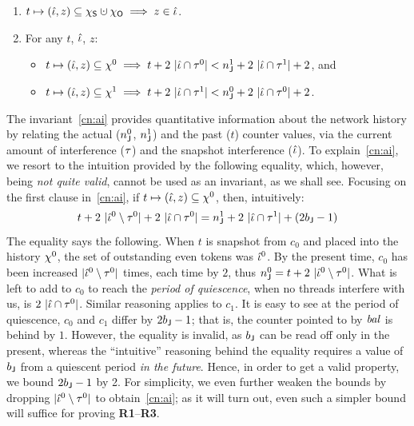 \begin{enumerate}[label=(\roman*)]

\item\label{cn:ti1}
%
  $t \mapsto (\tknh, z) \subseteq \hists \hunion \histo
  \implies z \in \tknh$. \\[-7pt]

\item\label{cn:ai} 
%
For any $t$, $\hat{\iota}$, $z$: \\[-7pt]
% 
{\small
  \begin{itemize}
  \item   $t \mapsto (\hat{\iota}, z) \subseteq \chi^0 \implies t + 2\ |\hat{\iota}
    \cap \tau^0| < n^1_{\mathsf{J}} + 2\ |\hat{\iota} \cap \tau^1| + 2$, and \\[-7pt]
  \item
    $t \mapsto (\hat{\iota}, z) \subseteq \chi^1 \implies t + 2\ |\hat{\iota} \cap 
    \tau^1| < n^0_{\mathsf{J}} + 2\ |\hat{\iota} \cap \tau^0|
    + 2$.
  \end{itemize}
}
%
\end{enumerate}
\vspace{5pt}
 
\noindent
The invariant~\ref{cn:ai} provides quantitative information about the
network history by relating the actual ($n^0_{\mathsf{J}}$, $n^1_{\mathsf{J}}$)
and the past ($t$) counter values, via the current amount of
interference ($\tau$) and the snapshot interference ($\hat{\iota}$).
%
To explain~\ref{cn:ai}, we resort to the intuition provided by the
following equality, which, however, being \emph{not quite valid},
cannot be used as an invariant, as we shall see. Focusing on the
first clause in~\ref{cn:ai}, if
$t \mapsto (\hat{\iota}, z) \subseteq \chi^0$, then,
intuitively:
%
{\small{
\[
t + 2\ |\tknh^0 \setminus \tkn^0 | + 2\ |\tknh \cap \tkn^0| =
n^1_\joint + 2\ |\tknh \cap \tkn^1| + (2 b_\joint - 1)
\]}}
%
\noindent
The equality says the following. When $t$ is snapshot from $c_0$ and
placed into the history $\chi^0$, the set of outstanding even tokens
was $\hat{\iota}^0$. By the present time, $c_0$ has been increased
$|\hat{\iota}^0 \setminus \tau^0|$ times, each time by $2$, thus
$n^0_{\mathsf{J}} = t + 2\ |\hat{\iota}^0 \setminus \tau^0|$. What is left to add
to $c_0$ to reach the \emph{period of quiescence}, when no threads
interfere with us, is $2\ |\hat{\iota} \cap \tau^0|$. Similar reasoning
applies to $c_1$. It is easy to see at the period of quiescence, $c_0$
and $c_1$ differ by $2 b_{\mathsf{J}} - 1$; that is, the counter pointed to
by $\mathit{bal}$ is behind by $1$. However, the equality is invalid, as
$b_{\mathsf{J}}$ can be read off only in the present, whereas the
``intuitive'' reasoning behind the equality requires a value of
$b_{\mathsf{J}}$ from a quiescent period \emph{in the future}. Hence, in
order to get a valid property, we bound $2 b_{\mathsf{J}} - 1$ by 2. For
simplicity, we even further weaken the bounds by dropping
$|\hat{\iota}^0 \setminus \tau^0|$ to obtain~\ref{cn:ai}; as it will turn
out, even such a simpler bound will suffice for proving
\textbf{R1}--\textbf{R3}.

